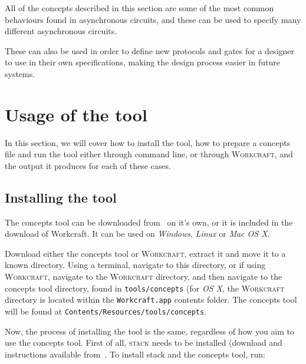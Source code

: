 \documentclass[british,conference,compsoc]{IEEEtran}
\newcommand{\noun}[1]{\textsc{#1}}
\begin{document}
\noindent All of the concepts described in this section are some of the most
common behaviours found in asynchronous circuits, and these can be used
to specify many different asynchronous circuits. 

These can also be used in order to define new protocols and gates for a designer
to use in their own specifications, making the design process easier in future 
systems. 

\vspace{-3mm}

\section{Usage of the tool\label{sec:tool-use}}

\vspace{-2mm}

In this section, we will cover how to install the tool, how to prepare a
concepts file and  run the tool either through command line, or through 
\noun{Workcraft}, and the output it produces for each of these cases.

\vspace{-2mm}

\subsection{Installing the tool \label{sub:installing}}

\vspace{-2mm}

The concepts tool can be downloaded from~\cite{2016_concepts_github} on it's
own, or it is included in the download of Workcraft. It can be used on 
\emph{Windows}, \emph{Linux} or \emph{Mac OS X}.

Download either the concepts tool or \noun{Workcraft}, extract it and move it to
a known directory. Using a terminal, navigate to this directory,
or if using \noun{Workcraft}, navigate to the \noun{Workcraft} directory, and
then navigate to the concepts tool directory, found in \texttt{tools/concepts} 
(for \emph{OS X}, the \noun{Workcraft} directory is located within the 
\texttt{Workcraft.app} contents folder. The concepts tool will be found at 
\texttt{Contents/Resources/tools/concepts}.

Now, the process of installing the tool is the same, regardless of how you aim 
to use the concepts tool. First of all,  \noun{stack} needs to be installed 
(download and instructions available from~\cite{stack_website}. 
To install stack and the concepts tool, run: 
\end{document}
